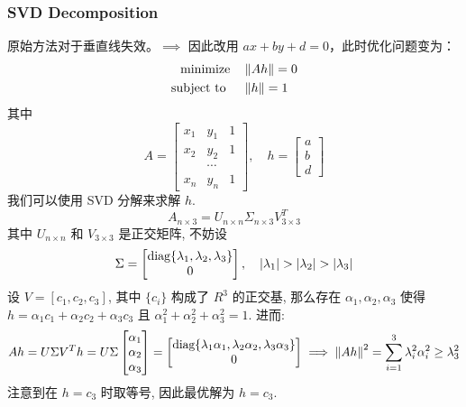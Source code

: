 \subsubsection{SVD Decomposition}
原始方法对于垂直线失效。$\implies$ 因此改用 $ax + by + d = 0$，此时优化问题变为：\begin{align*}
    \text{minimize} &\quad \left \Vert A h \right \Vert = 0 \\ 
    \text{subject to } &\quad \left \Vert h \right \Vert = 1
\end{align*}
其中 
\[
    \renewcommand{\arraystretch}{0.85}
    A = \begin{bmatrix}
        x_1 & y_1 & 1 \\
        x_2 & y_2 & 1\\
        & \cdots &  \\
        x_n & y_n & 1
    \end{bmatrix}, \quad h = \begin{bmatrix}
        a \\ b \\ d
    \end{bmatrix}
\]
我们可以使用 SVD 分解来求解 $h$. 
\[
    A_{n\times 3} = U_{n\times n} \Sigma_{n\times 3} V_{3\times 3}^T 
\]
其中 $U_{n\times n}$ 和 $V_{3\times 3}$ 是正交矩阵, 不妨设
\[
    \Sigma = \begin{bmatrix}
        \textup{diag}\{\lambda_1, \lambda_2, \lambda_3\} \\
        0
    \end{bmatrix}, \quad |\lambda_1| > |\lambda_2| > |\lambda_3|
\]
设 $V = [c_1, c_2, c_3]$, 其中 $\{c_i\}$ 构成了 $R^3$ 的正交基, 那么存在 $\alpha_1, \alpha_2, \alpha_3$ 使得
$ h = \alpha_1 c_1 + \alpha_2 c_2 + \alpha_3 c_3$ 且 $\alpha_1^2 + \alpha_2^2 + \alpha_3^2 = 1$.
进而:
\begin{align*}
    Ah = U \Sigma V^T h = U \Sigma \begin{bmatrix}
        \alpha_1 \\ \alpha_2 \\ \alpha_3
    \end{bmatrix} = \begin{bmatrix}
        \textup{diag}\{\lambda_1 \alpha_1, \lambda_2 \alpha_2, \lambda_3 \alpha_3\} \\
        0
    \end{bmatrix} \implies \left \Vert Ah \right \Vert^2 = \sum_{i=1}^{3} \lambda_i^2 \alpha_i^2 \ge \lambda_3^2
\end{align*} 
注意到在 $h = c_3$ 时取等号, 因此最优解为 $h = c_3$.


